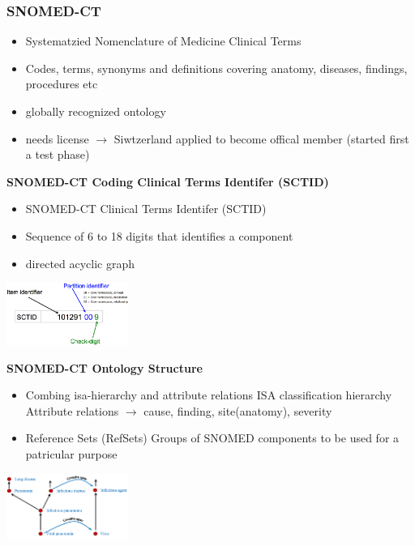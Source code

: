 \documentclass{report}
\newenvironment{Figure}
	{\par\medskip\noindent\minipage{\linewidth}}
	{\endminipage\par\medskip}
\theoremstyle{definition}
\theoremstyle{example}
\begin{document}
\subsubsection{SNOMED-CT}
\begin{itemize}
   \item Systematzied Nomenclature of Medicine Clinical Terms
   \item Codes, terms, synonyms and definitions covering anatomy, diseases, findings, procedures etc
   \item globally recognized ontology
   \item needs license $\rightarrow$ Siwtzerland applied to become offical member (started first a test phase)
\end{itemize}
\textbf{SNOMED-CT Coding Clinical Terms Identifer (SCTID)}\\
\begin{itemize}
   \item SNOMED-CT Clinical Terms Identifer (SCTID)
   \item Sequence of 6 to 18 digits that identifies a component
   \item directed acyclic graph
\end{itemize}
\begin{Figure}
   \centering
    \includegraphics[width=150px]{img/SCTID.png}
        \label{fig:example for SCTID}
\end{Figure}

\textbf{SNOMED-CT Ontology Structure}
\begin{itemize}
   \item Combing isa-hierarchy and attribute relations
   \subitem ISA classification hierarchy
   \subitem Attribute relations $\rightarrow$ cause, finding, site(anatomy), severity 
   \item Reference Sets (RefSets)
   \subitem Groups of SNOMED components to be used for a patricular purpose 
\end{itemize}

\begin{Figure}
   \centering
    \includegraphics[width=150px]{img/SNOMED Ontology.png}
        \label{fig:SNOMED-CT Ontology Structure}
\end{Figure}
\end{document}
